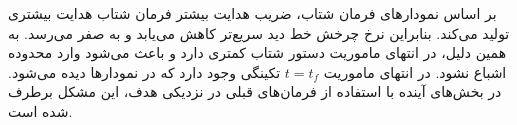 بر اساس نمودارهای فرمان شتاب، ضریب هدایت بیشتر فرمان شتاب هدایت بیشتری تولید می‌کند. بنابراین نرخ چرخش خط دید سریع‌تر کاهش می‌یابد و به صفر می‌رسد. به همین دلیل، در انتهای ماموریت دستور شتاب کمتری دارد و باعث می‌شود وارد محدوده اشباع نشود. در انتهای ماموریت $t= t_f$ تکینگی وجود دارد که در نمودارها دیده می‌شود. در بخش‌های آینده با استفاده از فرمان‌های قبلی در نزدیکی هدف، این مشکل برطرف شده است.